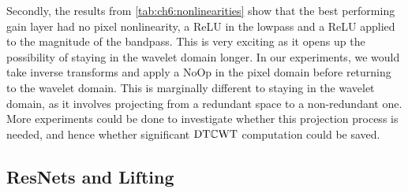 Secondly, the results from \autoref{tab:ch6:nonlinearities} show that the best
performing gain layer had no pixel nonlinearity, a ReLU in the lowpass and
a ReLU applied to the magnitude of the bandpass. This is very exciting as it
opens up the possibility of staying in the wavelet domain longer. In our
experiments, we would take inverse transforms and apply a NoOp in the pixel
domain before returning to the wavelet domain. This is marginally different
to staying in the wavelet domain, as it involves projecting from a redundant
space to a non-redundant one. More experiments could be done to investigate
whether this projection process is needed, and hence whether significant
$\mathrm{DT}\mathbb{C}\mathrm{WT}$ computation could be saved.

\subsection{ResNets and Lifting}

